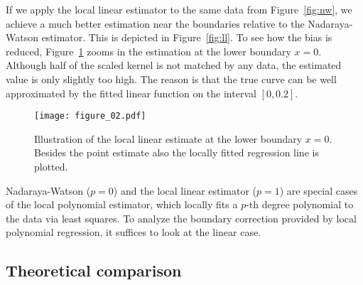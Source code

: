If we apply the local linear estimator to the same data from Figure~\ref{fig:nw},
we achieve a much better estimation near the boundaries relative to the Nadaraya-Watson estimator.
This is depicted in Figure~\ref{fig:ll}.
To see how the bias is reduced, Figure~\ref{fig:ll_boundary} zooms in the estimation at the lower boundary $x = 0$.
Although half of the scaled kernel is not matched by any data, the estimated value is only slightly too high.
The reason is that the true curve can be well approximated by the fitted linear function on the interval $[0, 0.2]$. 
\begin{figure}
	\centering
	\texttt{[image: figure\_02.pdf]}
	\caption{Illustration of the local linear estimate at the lower boundary $x = 0$.
			 Besides the point estimate also the locally fitted regression line is plotted.}
	\label{fig:ll_boundary}
\end{figure}

\begin{remark}
	Nadaraya-Watson ($p = 0$) and the local linear estimator ($p = 1$) are special cases of the local polynomial estimator,
	which locally fits a $p$-th degree polynomial to the data via least squares.
	To analyze the boundary correction provided by local polynomial regression, it suffices to look at the linear case.
\end{remark}

\subsection{Theoretical comparison} \label{subsec:theoretical_comparison}

